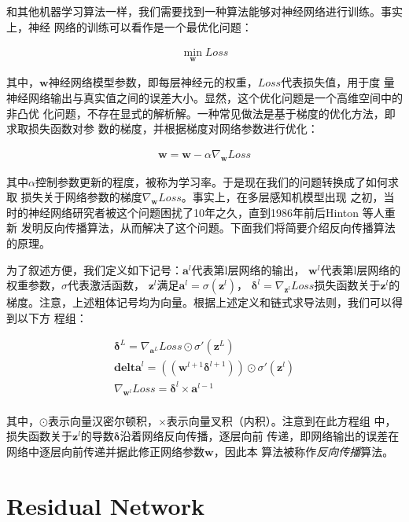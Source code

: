 和其他机器学习算法一样，我们需要找到一种算法能够对神经网络进行训练。事实上，神经
网络的训练可以看作是一个最优化问题：

\begin{align}
\min_{\mathbf{w}}{Loss}
\end{align}

其中，$\mathbf{w}$神经网络模型参数，即每层神经元的权重，$Loss$代表损失值，用于度
量神经网络输出与真实值之间的误差大小。显然，这个优化问题是一个高维空间中的非凸优
化问题，不存在显式的解析解。一种常见做法是基于梯度的优化方法，即求取损失函数对参
数的梯度，并根据梯度对网络参数进行优化：

\begin{align}
\mathbf{w} = \mathbf{w} - \alpha\nabla_{\mathbf{w}}{Loss}
\end{align}

其中$\alpha$控制参数更新的程度，被称为学习率。于是现在我们的问题转换成了如何求取
损失关于网络参数的梯度$\nabla_{\mathbf{w}}{Loss}$。事实上，在多层感知机模型出现
之初，当时的神经网络研究者被这个问题困扰了10年之久，直到1986年前后Hinton 等人重新
发明反向传播算法，从而解决了这个问题。下面我们将简要介绍反向传播算法的原理。

为了叙述方便，我们定义如下记号：$\mathbf{a}^{l}$代表第l层网络的输出，
$\mathbf{w}^{l}$代表第l层网络的权重参数，$\sigma$代表激活函数，
$\mathbf{z}^{l}$满足$\mathbf{a}^{l} = \sigma(\mathbf{z}^{l})$，
$\mathbf{\delta}^{l} = \nabla_{\mathbf{z}^l}{Loss}$损失函数关于$\mathbf{z}^l$的
梯度。注意，上述粗体记号均为向量。根据上述定义和链式求导法则，我们可以得到以下方
程组：

\begin{align}
  \mathbf{\delta}^L = \nabla_{\mathbf{a}^L}{Loss} \odot \sigma'(\mathbf{z}^L) \\
  \mathbf{delta}^l = ((\mathbf{w}^{l+1}\mathbf{\delta}^{l+1})) \odot \sigma'(\mathbf{z}^l) \\
  \nabla_{\mathbf{w}^l}{Loss} = \mathbf{\delta}^l \times \mathbf{a}^{l-1} \\
\end{align}

其中，$\odot$表示向量汉密尔顿积，$\times$表示向量叉积（内积）。注意到在此方程组
中，损失函数关于$\mathbf{z}^l$的导数$\mathbf{\delta}$沿着网络反向传播，逐层向前
传递，即网络输出的误差在网络中逐层向前传递并据此修正网络参数$\mathbf{w}$，因此本
算法被称作\textit{反向传播}算法。

\section{Residual Network}

